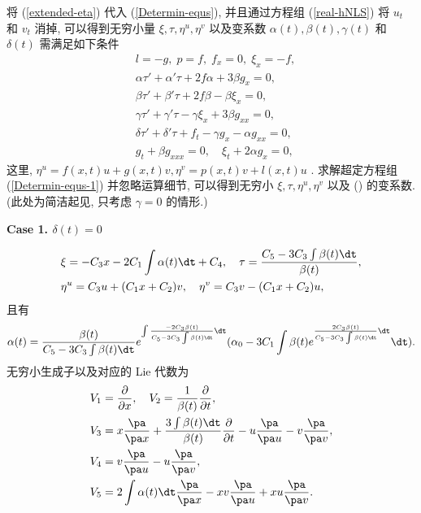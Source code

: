 将 (\ref{extended-eta}) 代入 (\ref{Determin-equs}), 并且通过方程组 (\ref{real-hNLS}) 将 $u_t$ 和 $v_t$ 消掉, 可以得到无穷小量 $\xi, \tau, \eta^u, \eta^v$ 以及变系数  $\alpha(t), \beta(t), \gamma(t)$ 和 $\delta(t)$ 需满足如下条件
\begin{equation}\label{Determin-equs-1}
\begin{aligned}
&l=-g,\; p=f,\; f_x=0,\; \xi_x=-f,\\
&\alpha\tau'+\alpha'\tau+2f\alpha+3\beta g_x=0,\\
&\beta\tau'+\beta'\tau+2f\beta-\beta\xi_x=0,\\
&\gamma\tau'+\gamma'\tau-\gamma\xi_x+3\beta g_{xx}=0,\\
&\delta\tau'+\delta'\tau+f_t-\gamma g_x-\alpha g_{xx}=0,\\
&g_t+\beta g_{xxx}=0,\quad \xi_t+2\alpha g_x=0,
\end{aligned}
\end{equation}
这里, $\eta^u=f(x,t)u+g(x,t)v, \eta^v=p(x,t)v+l(x,t)u$ \cite{Bluman2002}.
求解超定方程组 (\ref{Determin-equs-1}) 并忽略运算细节, 可以得到无穷小
$\xi, \tau, \eta^u, \eta^v$ 以及 () 的变系数. (此处为简洁起见, 只考虑 $\gamma=0$ 的情形.)

\noindent \textbf{Case 1. $\delta(t)=0$}

\begin{align*}
&\xi=-C_3 x-2C_1\int\alpha(t)\dt+C_4,\quad \tau=\frac{C_5-3C_3\int\beta(t)\dt}{\beta(t)},\\
&\eta^u=C_3 u+(C_1x+C_2)v,\quad \eta^v=C_3 v-(C_1x+C_2)u,
\end{align*}
且有
\begin{equation*}
\alpha(t)=\frac{\beta(t)}{C_5-3C_3\int\beta(t)\dt} e^{\int\frac{-2C_3\beta(t)}{C_5-3C_3\int\beta(t)\dt}\dt} (\alpha_0-3C_1\int\beta(t)e^{\frac{2C_3\beta(t)}{C_5-3C_3\int\beta(t)\dt}\dt}\dt).
\end{equation*}
无穷小生成子以及对应的 Lie 代数为
\begin{align*}
&V_1=\frac{\partial}{\partial x},\quad V_2=\frac{1}{\beta(t)}\frac{\partial}{\partial t},\\
&V_3=x\frac{\pa}{\pa x}+\frac{3\int\beta(t)\dt}{\beta(t)}\frac{\partial}{\partial t}-u\frac{\pa}{\pa u}-v\frac{\pa}{\pa v},\\
&V_4=v\frac{\pa}{\pa u}-u\frac{\pa}{\pa v},\\
&V_5=2\int \alpha(t)\dt\frac{\pa}{\pa x}-xv\frac{\pa}{\pa u}+xu\frac{\pa}{\pa v}.
\end{align*}


